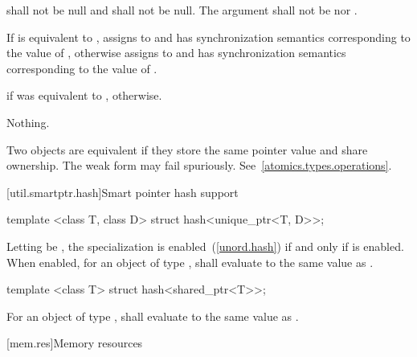 \begin{itemdescr}
\pnum
\requires {} shall not be null and  shall not be null.
The  argument shall not be  nor
.

\pnum
\effects If  is equivalent to , assigns  to
 and has synchronization semantics corresponding to the value of
, otherwise assigns  to  and has
synchronization semantics corresponding to the value of .

\pnum
\returns {} if  was equivalent to ,  otherwise.

\pnum
\throws Nothing.

\pnum
\remarks Two  objects are equivalent if they store the same
pointer value and share ownership.
The weak form may fail spuriously. See~\ref{atomics.types.operations}.
\end{itemdescr}

[util.smartptr.hash]{Smart pointer hash support}

%
\begin{itemdecl}
template <class T, class D> struct hash<unique_ptr<T, D>>;
\end{itemdecl}

\begin{itemdescr}
\pnum
Letting  be ,
the specialization  is enabled~(\ref{unord.hash})
if and only if  is enabled.
When enabled, for an object  of type ,
 shall evaluate to
the same value as .
\end{itemdescr}

%
\begin{itemdecl}
template <class T> struct hash<shared_ptr<T>>;
\end{itemdecl}

\begin{itemdescr}
\pnum
For an object  of type ,
 shall evaluate to
the same value as .
\end{itemdescr}%

[mem.res]{Memory resources}

